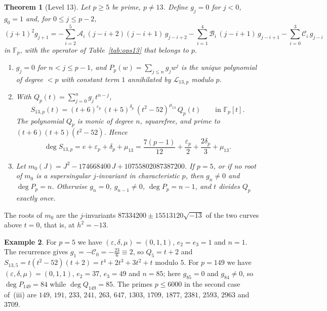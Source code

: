 \documentclass[11pt,a4paper]{article}
\newtheorem{theorem}{Theorem}[section]
\theoremstyle{definition}
\newtheorem{example}[theorem]{Example}
\theoremstyle{remark}
\newcommand{\F}{\mathbb{F}}
\newcommand{\cL}{\mathcal{L}}
\newcommand{\cA}{\mathcal{A}}
\newcommand{\cB}{\mathcal{B}}
\newcommand{\cC}{\mathcal{C}}
\numberwithin{equation}{section}
\begin{document}
\begin{theorem}[Level 13]\label{thm:13}
Let $p\ge5$ be prime, $p\ne13$. Define $g_j=0$ for $j<0$, $g_0=1$ and, for
$0\le j\le p-2$,
\begin{equation}\label{eq:rec13}
(j+1)^2g_{j+1}=-\sum_{i=2}^{5}\cA_i\,(j-i+2)(j-i+1)\,g_{j-i+2}
-\sum_{i=1}^{4}\cB_i\,(j-i+1)\,g_{j-i+1}-\sum_{i=0}^{3}\cC_i\,g_{j-i}
\end{equation}
in $\F_p$, with the operator of Table~\ref{tab:ops13} that belongs to $p$.
\begin{enumerate}
\item[(i)] $g_j=0$ for $n<j\le p-1$, and $P_p(w)=\sum_{j\le n}g_jw^j$ is the
unique polynomial of degree $<p$ with constant term $1$ annihilated by
$\cL_{13,p}$ modulo $p$.
\item[(ii)] With $Q_p(t)=\sum_{j=0}^{n}g_j\,t^{n-j}$,
\begin{equation}\label{eq:13formula}
S_{13,p}(t)=(t+6)^{\varepsilon_p}\,(t+5)^{\delta_p}\,(t^2-52)^{\mu_{13}}\,Q_p(t)
\qquad\text{in }\F_p[t].
\end{equation}
The polynomial $Q_p$ is monic of degree $n$, squarefree, and prime to
$(t+6)(t+5)(t^2-52)$. Hence
\[
\deg S_{13,p}=e+\varepsilon_p+\delta_p+\mu_{13}
=\frac{7(p-1)}{12}+\frac{\varepsilon_p}2+\frac{2\delta_p}3+\mu_{13}.
\]
\item[(iii)] Let $m_0(J)=J^2-174668400\,J+10755802087387200$. If $p=5$, or if
no root of $m_0$ is a supersingular $j$-invariant in characteristic $p$, then
$g_n\ne0$ and $\deg P_p=n$. Otherwise $g_n=0$, $g_{n-1}\ne0$,
$\deg P_p=n-1$, and $t$ divides $Q_p$ exactly once.
\end{enumerate}
\end{theorem}

The roots of $m_0$ are the $j$-invariants
$87334200\pm15513120\sqrt{-13}$ of the two curves above $t=0$, that is, at
$h^2=-13$.

\begin{example}\label{ex:13}
For $p=5$ we have $(\varepsilon,\delta,\mu)=(0,1,1)$, $e_2=e_3=1$ and $n=1$.
The recurrence gives $g_1=-\cC_0=-\frac{23}{6}\equiv2$, so $Q_5=t+2$ and
$S_{13,5}=t(t^2-52)(t+2)=t^4+2t^3+3t^2+t$ modulo $5$.
For $p=149$ we have $(\varepsilon,\delta,\mu)=(0,1,1)$, $e_2=37$, $e_3=49$ and
$n=85$; here $g_{85}=0$ and $g_{84}\ne0$, so $\deg P_{149}=84$ while
$\deg Q_{149}=85$. The primes $p\le6000$ in the second case of~(iii) are
$149$, $191$, $233$, $241$, $263$, $647$, $1303$, $1709$, $1877$, $2381$,
$2593$, $2963$ and $3709$.
\end{example}
\end{document}
